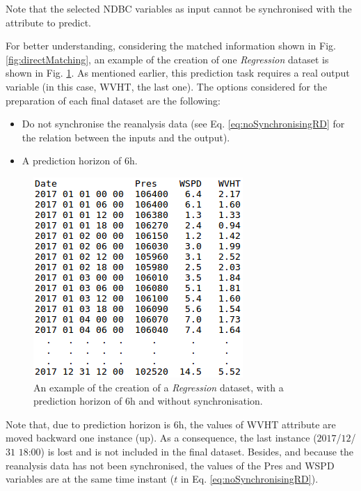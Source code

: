 \documentclass[review]{elsarticle}
\begin{document}
\begin{itemize}
						Note that the selected NDBC variables as input cannot be synchronised with the attribute to predict.
						
 						For better understanding, considering the matched information shown in Fig. \ref{fig:directMatching}, an example of the creation of one \textit{Regression} dataset is shown in Fig. \ref{fig:regressionNoSync}. As mentioned earlier, this prediction task requires a real output variable (in this case, WVHT, the last one). The options considered for the preparation of each final dataset are the following:
 							\begin{itemize}
 								\item Do not synchronise the reanalysis data (see Eq. \ref{eq:noSynchronisingRD} for the relation between the inputs and the output).
 								\item A prediction horizon of $6$h.
 							\end{itemize}
 							 							
							\begin{figure}[ht!]
								\centering
								\includegraphics[scale=0.49]{figures/FigureRegressionNoSync.png}
								\caption{An example of the creation of a \textit{Regression} dataset, with a prediction horizon of $6$h and without synchronisation.}
								\label{fig:regressionNoSync}
							\end{figure}
 						
 						Note that, due to prediction horizon is $6$h, the values of WVHT attribute are moved backward one instance (up). As a consequence, the last instance ($2017$/$12$/$31$ $18$:$00$) is lost and is not included in the final dataset. Besides, and because the reanalysis data has not been synchronised, the values of the Pres and WSPD variables are at the same time instant ($t$ in Eq. \ref{eq:noSynchronisingRD}).
						

\end{itemize}
\end{document}
